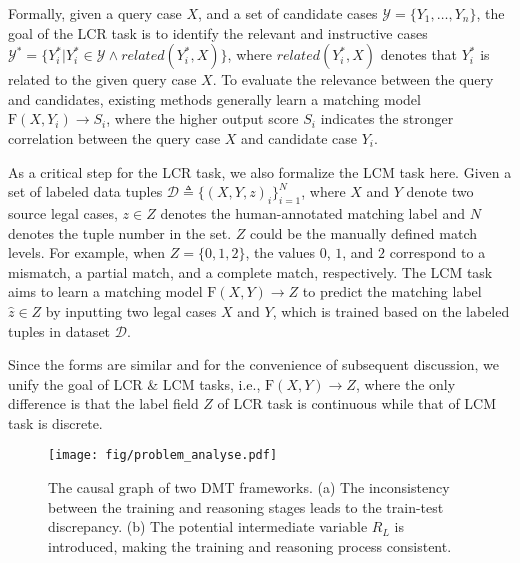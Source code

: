 Formally, given a query case $X$, and a set of candidate cases $\mathcal{Y} = \{Y_1, \ldots, Y_n\}$, 
the goal of the LCR task is to identify the relevant and instructive cases $\mathcal{Y}^{*} = \{Y_i^{*} | Y_i^{*}\in \mathcal{Y} \land \mathit{related}(Y_i^{*}, X) \}$, where $\mathit{related}(Y_i^{*}, X)$ denotes that $Y_i^{*}$ is related to the given query case $X$.
To evaluate the relevance between the query and candidates, existing methods generally learn a matching model $ \mathrm{F}(X, Y_i) \rightarrow S_i $, where the higher output score $S_i$ indicates the stronger correlation between the query case $X$ and candidate case $Y_i$.

As a critical step for the LCR task, we also formalize the LCM task here.
Given a set of labeled data tuples $\mathcal{D}\triangleq\{(X, Y, z)_{i}\}_{i=1}^{N}$, where $X$ and $Y$ denote two source legal cases, $z \in Z$ denotes the human-annotated matching label and $N$ denotes the tuple number in the set.
$Z$ could be the manually defined match levels.
For example, when $Z = \{0, 1, 2\}$, the values $0$, $1$, and $2$ correspond to a mismatch, a partial match, and a complete match, respectively.
The LCM task aims to learn a matching model $\mathrm{F}(X, Y) \rightarrow Z$ to predict the matching label $\hat{z} \in Z$ by inputting two legal cases $X$ and $Y$, which is trained based on the labeled tuples in dataset $\mathcal{D}$.

Since the forms are similar and for the convenience of subsequent discussion, we unify the goal of LCR \& LCM tasks, i.e., $\mathrm{F}(X, Y) \rightarrow Z$, where the only difference is that the label field $Z$ of LCR task is continuous while that of LCM task is discrete.

\begin{figure}[t]
\centering
\texttt{[image: fig/problem\_analyse.pdf]}
\caption{The causal graph of two DMT frameworks. (a) The inconsistency between the training and reasoning stages leads to the train-test discrepancy. (b) The potential intermediate variable $R_L$ is introduced, making the training and reasoning process consistent.}
\label{fig: problem_analyse}
\end{figure}

